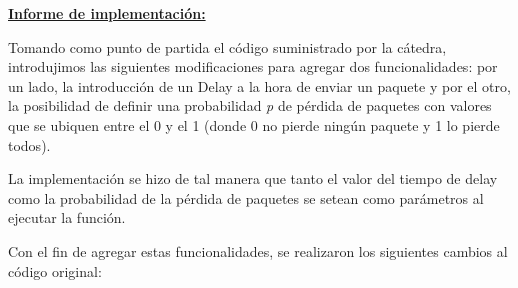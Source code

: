 \LARGE

\underline{\textbf{Informe de implementación:}} \\

\normalsize

Tomando como punto de partida el c\'odigo suministrado por la cátedra, introdujimos las siguientes modificaciones para agregar dos funcionalidades: por un lado, la introducción de un Delay a la hora de enviar un paquete y por el otro, la posibilidad de definir una probabilidad \textit{p} de pérdida de paquetes con valores que se ubiquen entre el 0 y el 1 (donde 0 no pierde ningún paquete y 1 lo pierde todos).

La implementación se hizo de tal manera que tanto el valor del tiempo de delay como la probabilidad de la p\'erdida de paquetes se setean como par\'ametros al ejecutar la funci\'on.

Con el fin de agregar estas funcionalidades, se realizaron los siguientes cambios al c\'odigo original:

